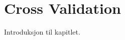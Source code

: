 \documentclass[../../main.tex]{subfiles}
\begin{document}

\section{Cross Validation}

Introduksjon til kapitlet.

\end{document}
